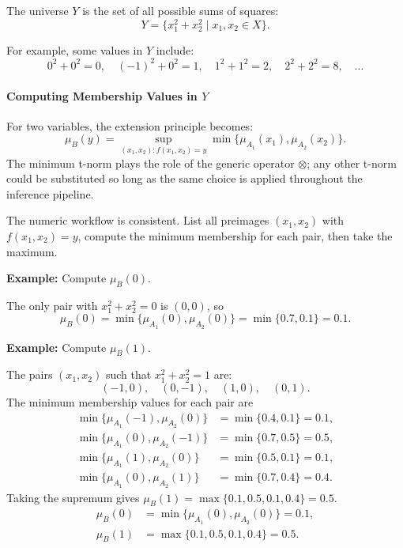 The universe \( Y \) is the set of all possible sums of squares:
\[
Y = \{x_1^2 + x_2^2 \mid x_1, x_2 \in X\}.
\]

For example, some values in \( Y \) include:
\[
0^2 + 0^2 = 0, \quad (-1)^2 + 0^2 = 1, \quad 1^2 + 1^2 = 2, \quad 2^2 + 2^2 = 8, \quad \ldots
\]

\paragraph{Computing Membership Values in \( Y \)}

For two variables, the extension principle becomes:
\begin{equation}
\mu_B(y) = \sup_{(x_1, x_2): f(x_1, x_2) = y} \min\{\mu_{A_1}(x_1), \mu_{A_2}(x_2)\}.
\label{eq:extension-two-var}
\end{equation}
The minimum t\hyp{}norm plays the role of the generic operator \(\otimes\); any other t\hyp{}norm could be substituted so long as the same choice is applied throughout the inference pipeline.

The numeric workflow is consistent. List all preimages \((x_1,x_2)\) with \(f(x_1,x_2)=y\), compute the minimum membership for each pair, then take the maximum.

\textbf{Example:} Compute \(\mu_B(0)\).

The only pair with \(x_1^2+x_2^2=0\) is \((0,0)\), so
\[
\mu_B(0) = \min\{\mu_{A_1}(0), \mu_{A_2}(0)\} = \min\{0.7, 0.1\} = 0.1.
\]

\textbf{Example:} Compute \(\mu_B(1)\).

The pairs \((x_1, x_2)\) such that \(x_1^2 + x_2^2 = 1\) are:
\[
(-1,0), \quad (0,-1), \quad (1,0), \quad (0,1).
\]
The minimum membership values for each pair are
\begin{align*}
    \min\{\mu_{A_1}(-1), \mu_{A_2}(0)\} &= \min\{0.4, 0.1\} = 0.1, \\
    \min\{\mu_{A_1}(0), \mu_{A_2}(-1)\} &= \min\{0.7, 0.5\} = 0.5, \\
    \min\{\mu_{A_1}(1), \mu_{A_2}(0)\} &= \min\{0.5, 0.1\} = 0.1, \\
    \min\{\mu_{A_1}(0), \mu_{A_2}(1)\} &= \min\{0.7, 0.4\} = 0.4.
\end{align*}
Taking the supremum gives \(\mu_B(1)=\max\{0.1,0.5,0.1,0.4\}=0.5\).
\begin{equation}
\begin{aligned}
\mu_B(0) &= \min\{\mu_{A_1}(0), \mu_{A_2}(0)\} = 0.1,\\
\mu_B(1) &= \max\{0.1, 0.5, 0.1, 0.4\} = 0.5.
\end{aligned}
\label{eq:extension_two_var_example}
\end{equation}

